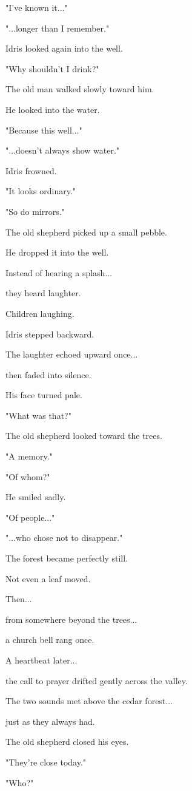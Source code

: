 \documentclass[12pt,openany]{book}
\begin{document}
"I've known it..."

"...longer than I remember."

Idris looked again into the well.

"Why shouldn't I drink?"

The old man walked slowly toward him.

He looked into the water.

"Because this well..."

"...doesn't always show water."

Idris frowned.

"It looks ordinary."

"So do mirrors."

The old shepherd picked up a small pebble.

He dropped it into the well.

Instead of hearing a splash...

they heard laughter.

Children laughing.

Idris stepped backward.

The laughter echoed upward once...

then faded into silence.

His face turned pale.

"What was that?"

The old shepherd looked toward the trees.

"A memory."

"Of whom?"

He smiled sadly.

"Of people..."

"...who chose not to disappear."

The forest became perfectly still.

Not even a leaf moved.

Then...

from somewhere beyond the trees...

a church bell rang once.

A heartbeat later...

the call to prayer drifted gently across the valley.

The two sounds met above the cedar forest...

just as they always had.

The old shepherd closed his eyes.

"They're close today."

"Who?"
\end{document}
